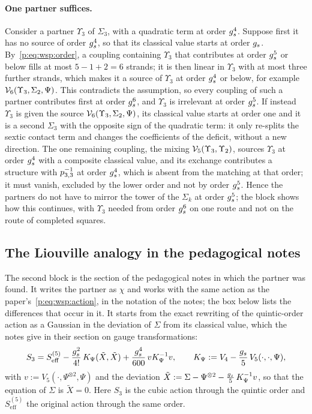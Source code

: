 \paragraph{One partner suffices.}
Consider a partner $\Upsilon_3$ of $\Sigma_3$, with a quadratic term at order $g_s^4$.
Suppose first it has no source of order $g_s^4$, so that its classical value starts at order $g_s$.
By~\eqref{p:eq:wsp:order}, a coupling containing $\Upsilon_3$ that contributes at order $g_s^5$ or below fills at most $5 - 1 + 2 = 6$ strands; it is then linear in $\Upsilon_3$ with at most three further strands, which makes it a source of $\Upsilon_3$ at order $g_s^4$ or below, for example $\mathcal{V}_{6}(\Upsilon_3, \Sigma_2, \Psi)$.
This contradicts the assumption, so every coupling of such a partner contributes first at order $g_s^6$, and $\Upsilon_3$ is irrelevant at order $g_s^5$.
If instead $\Upsilon_3$ is given the source $\mathcal{V}_{6}(\Upsilon_3, \Sigma_2, \Psi)$, its classical value starts at order one and it is a second $\Sigma_3$ with the opposite sign of the quadratic term: it only re-splits the sextic contact term and changes the coefficients of the deficit, without a new direction.
The one remaining coupling, the mixing $\mathcal{V}_{5}(\Upsilon_3, \Upsilon_2)$, sources $\Upsilon_3$ at order $g_s^4$ with a composite classical value, and its exchange contributes a structure with $p_{3,3}^{-1}$ at order $g_s^4$, which is absent from the matching at that order; it must vanish, excluded by the lower order and not by order $g_s^5$.
Hence the partners do not have to mirror the tower of the $\Sigma_k$ at order $g_s^5$; the block shows how this continues, with $\Upsilon_3$ needed from order $g_s^6$ on one route and not on the route of completed squares.

\subsection{The Liouville analogy in the pedagogical notes}
\label{sec:partner:liouville}

The second block is the section of the pedagogical notes in which the partner was found.
It writes the partner as $\chi$ and works with the same action as the paper's~\eqref{p:eq:wsp:action}, in the notation of the notes; the box below lists the differences that occur in it.
It starts from the exact rewriting of the quintic-order action as a Gaussian in the deviation of $\Sigma$ from its classical value, which the notes give in their section on gauge transformations:
\begin{equation}
  \label{eq:partner:S3rewrite}
  S_3
    = S^{(5)}_{\mathrm{eff}}
      - \frac{g_s^2}{4!} \, K_\Psi(\tilde X, \tilde X)
      + \frac{g_s^4}{600} \, v K_\Psi^{-1} v,
  \qquad
  K_\Psi
    := V_4 - \frac{g_s}{5} \, V_5(\cdot, \cdot, \Psi),
\end{equation}
with $v := V_5(\cdot, \Psi^{\otimes 2}, \Psi)$ and the deviation $\tilde X := \Sigma - \Psi^{\otimes 2} - \frac{g_s}{5} \, K_\Psi^{-1} v$, so that the equation of $\Sigma$ is $\tilde X = 0$.
Here $S_3$ is the cubic action through the quintic order and $S^{(5)}_{\mathrm{eff}}$ the original action through the same order.

